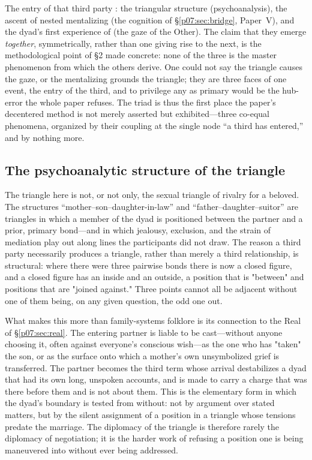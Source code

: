 \documentclass[11pt,a4paper]{article}
\newcommand{\emb}[1]{\textcolor{rose}{\oldtextbf{#1}}}
\newcommand{\xref}[1]{\textcolor{rose}{\S\ref{#1}}}
\newcommand{\pinkref}[1]{\textcolor{rose}{#1}}
\begin{document}
The entry of that third party \emb{activates three things at once}: the triangular structure (psychoanalysis), the ascent of nested mentalizing (the cognition of \xref{p07:sec:bridge}, \pinkref{Paper~V}), and the dyad's first experience of \emb{being watched as a whole} (the gaze of the Other). The claim that they emerge \emph{together}, symmetrically, rather than one giving rise to the next, is the methodological point of \pinkref{§2} made concrete: none of the three is the master phenomenon from which the others derive. One could not say the triangle causes the gaze, or the mentalizing grounds the triangle; they are three faces of one event, the entry of the third, and to privilege any as primary would be the hub-error the whole paper refuses. The triad is thus the first place the paper's decentered method is not merely asserted but exhibited---three co-equal phenomena, organized by their coupling at the single node ``a third has entered,'' and by nothing more.

\subsection{The psychoanalytic structure of the triangle}
The triangle here is not, or not only, the sexual triangle of rivalry for a beloved. The structures ``mother--son--daughter-in-law'' and ``father--daughter--suitor'' are triangles in which a member of the dyad is positioned between the partner and a prior, primary bond---and in which jealousy, exclusion, and the strain of mediation play out along lines the participants did not draw. The reason a third party necessarily produces a triangle, rather than merely a third relationship, is structural: where there were three pairwise bonds there is now a closed figure, and a closed figure has an inside and an outside, a position that is "between" and positions that are "joined against." Three points cannot all be adjacent without one of them being, on any given question, the odd one out.

What makes this more than family-systems folklore is its connection to the Real of \xref{p07:sec:real}. The entering partner is liable to be cast---without anyone choosing it, often against everyone's conscious wish---as the one who has "taken" the son, or as the surface onto which a mother's own unsymbolized grief is transferred. The partner becomes the third term whose arrival destabilizes a dyad that had its own long, unspoken accounts, and is made to carry a charge that was there before them and is not about them. This is the elementary form in which the dyad's boundary is tested from without: not by argument over stated matters, but by the silent assignment of a position in a triangle whose tensions predate the marriage. The diplomacy of the triangle is therefore rarely the diplomacy of negotiation; it is the harder work of refusing a position one is being maneuvered into without ever being addressed.
\end{document}
